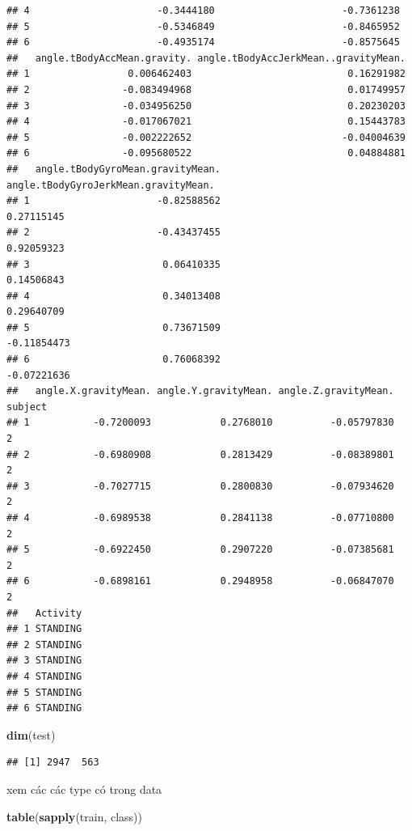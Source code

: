 \documentclass[
]{article}
\newenvironment{Shaded}{\begin{snugshade}}{\end{snugshade}}
\newcommand{\FunctionTok}[1]{\textcolor[rgb]{0.13,0.29,0.53}{\textbf{#1}}}
\newcommand{\NormalTok}[1]{#1}
\begin{document}
\begin{verbatim}
## 4                      -0.3444180                      -0.7361238
## 5                      -0.5346849                      -0.8465952
## 6                      -0.4935174                      -0.8575645
##   angle.tBodyAccMean.gravity. angle.tBodyAccJerkMean..gravityMean.
## 1                 0.006462403                           0.16291982
## 2                -0.083494968                           0.01749957
## 3                -0.034956250                           0.20230203
## 4                -0.017067021                           0.15443783
## 5                -0.002222652                          -0.04004639
## 6                -0.095680522                           0.04884881
##   angle.tBodyGyroMean.gravityMean. angle.tBodyGyroJerkMean.gravityMean.
## 1                      -0.82588562                           0.27115145
## 2                      -0.43437455                           0.92059323
## 3                       0.06410335                           0.14506843
## 4                       0.34013408                           0.29640709
## 5                       0.73671509                          -0.11854473
## 6                       0.76068392                          -0.07221636
##   angle.X.gravityMean. angle.Y.gravityMean. angle.Z.gravityMean. subject
## 1           -0.7200093            0.2768010          -0.05797830       2
## 2           -0.6980908            0.2813429          -0.08389801       2
## 3           -0.7027715            0.2800830          -0.07934620       2
## 4           -0.6989538            0.2841138          -0.07710800       2
## 5           -0.6922450            0.2907220          -0.07385681       2
## 6           -0.6898161            0.2948958          -0.06847070       2
##   Activity
## 1 STANDING
## 2 STANDING
## 3 STANDING
## 4 STANDING
## 5 STANDING
## 6 STANDING
\end{verbatim}

\begin{Shaded}
\begin{Highlighting}[]
\FunctionTok{dim}\NormalTok{(test)}
\end{Highlighting}
\end{Shaded}

\begin{verbatim}
## [1] 2947  563
\end{verbatim}

xem các các type có trong data

\begin{Shaded}
\begin{Highlighting}[]
\FunctionTok{table}\NormalTok{(}\FunctionTok{sapply}\NormalTok{(train, class))}
\end{Highlighting}
\end{Shaded}
\end{document}
